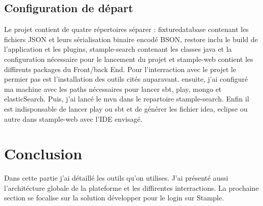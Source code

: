 \documentclass[11pt]{article} %
\begin{document}
\subsection{Configuration de départ}
Le projet contient de quatre répertoires séparer : fixturedatabase contenant les fichiers JSON et leurs sérialisation binaire encodé BSON, restore inclu le build de l'application et les plugins, stample-search contenant les classes java et la configuration nécessaire pour le lancement du projet et stample-web contient les diffirents packages du Front/back End.
Pour l'interraction avec le projet le permier pas est l'installation des outils cités auparavant. ensuite, j'ai configuré ma machine avec les paths nécessaires pour lancer sbt, play, mongo et elasticSearch. Puis, j'ai lancé le mvn dans le repartoire stample-search. Enfin il est indisponsable de lancer play ou sbt et de générer les fichier idea, eclipse ou autre dans stample-web avec l'IDE envisagé.     

\section{Conclusion}
Dans cette partie j'ai détaillé les outils qu'on utilises. J'ai présenté aussi l'architécture globale de la plateforme et les diffirentes interractions. La prochaine section se focalise sur la solution développer pour le login sur Stample.
\end{document}
